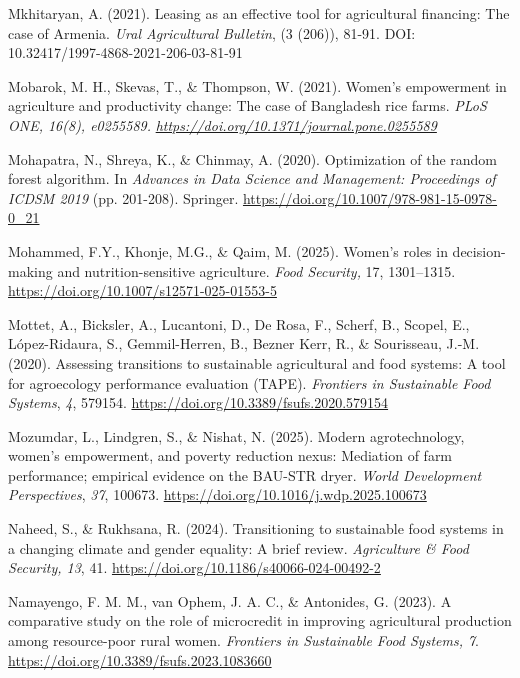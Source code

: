 ﻿\documentclass[sn-mathphys-num]{sn-jnl}
\newcommand{\hl}[1]{#1}
\begin{document}
\hl{Mkhitaryan, A. (2021). Leasing as an effective tool for agricultural
financing: The case of Armenia. \emph{Ural Agricultural Bulletin}, (3
(206)), 81-91.}
\hl{DOI: 10.32417/1997-4868-2021-206-03-81-91}

\hl{Mobarok, M. H., Skevas, T., \& Thompson, W. (2021). Women's
empowerment in agriculture and productivity change: The case of
Bangladesh rice farms. \emph{PLoS ONE, 16(8), e0255589.}}
\href{https://doi.org/10.1371/journal.pone.0255589}{\emph{\hl{https://doi.org/10.1371/journal.pone.0255589}}}

\hl{Mohapatra, N., Shreya, K., \& Chinmay, A. (2020). Optimization of
the random forest algorithm. In \emph{Advances in Data Science and
Management: Proceedings of ICDSM 2019} (pp. 201-208). Springer.}
\href{https://doi.org/10.1007/978-981-15-0978-0_21}{\hl{https://doi.org/10.1007/978-981-15-0978-0\_21}}

\hl{Mohammed, F.Y., Khonje, M.G., \& Qaim, M. (2025). Women's roles in
decision-making and nutrition-sensitive agriculture. \emph{Food
Security,} 17, 1301--1315.}
\href{https://doi.org/10.1007/s12571-025-01553-5}{\hl{https://doi.org/10.1007/s12571-025-01553-5}}

\hl{Mottet, A., Bicksler, A., Lucantoni, D., De Rosa, F., Scherf, B.,
Scopel, E., López-Ridaura, S., Gemmil-Herren, B., Bezner Kerr, R., \&
Sourisseau, J.-M. (2020). Assessing transitions to sustainable
agricultural and food systems: A tool for agroecology performance
evaluation (TAPE). \emph{Frontiers in Sustainable Food Systems},
\emph{4}, 579154.}
\href{https://doi.org/10.3389/fsufs.2020.579154}{\hl{https://doi.org/10.3389/fsufs.2020.579154}}

\hl{Mozumdar, L., Lindgren, S., \& Nishat, N. (2025). Modern
agrotechnology, women's empowerment, and poverty reduction nexus:
Mediation of farm performance; empirical evidence on the BAU-STR dryer.
\emph{World Development Perspectives}, \emph{37}, 100673.}
\href{https://doi.org/10.1016/j.wdp.2025.100673}{\hl{https://doi.org/10.1016/j.wdp.2025.100673}}

\hl{Naheed, S., \& Rukhsana, R. (2024). Transitioning to sustainable
food systems in a changing climate and gender equality: A brief review.
\emph{Agriculture \& Food Security, 13}, 41.}
\href{https://doi.org/10.1186/s40066-024-00492-2}{\hl{https://doi.org/10.1186/s40066-024-00492-2}}

\hl{Namayengo, F. M. M., van Ophem, J. A. C., \& Antonides, G. (2023). A
comparative study on the role of microcredit in improving agricultural
production among resource-poor rural women. \emph{Frontiers in
Sustainable Food Systems, 7}.}
\href{https://doi.org/10.3389/fsufs.2023.1083660}{\hl{https://doi.org/10.3389/fsufs.2023.1083660}}
\end{document}
